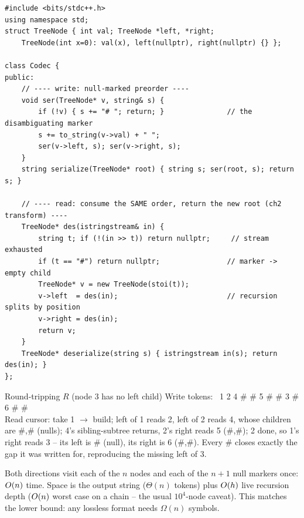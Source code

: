 \begin{lstlisting}[caption={Serialize/Deserialize (LeetCode 297) -- marked-preorder codec}, label={lst:c03-summit-codec}]
#include <bits/stdc++.h>
using namespace std;
struct TreeNode { int val; TreeNode *left, *right;
    TreeNode(int x=0): val(x), left(nullptr), right(nullptr) {} };

class Codec {
public:
    // ---- write: null-marked preorder ----
    void ser(TreeNode* v, string& s) {
        if (!v) { s += "# "; return; }               // the disambiguating marker
        s += to_string(v->val) + " ";
        ser(v->left, s); ser(v->right, s);
    }
    string serialize(TreeNode* root) { string s; ser(root, s); return s; }

    // ---- read: consume the SAME order, return the new root (ch2 transform) ----
    TreeNode* des(istringstream& in) {
        string t; if (!(in >> t)) return nullptr;     // stream exhausted
        if (t == "#") return nullptr;                // marker -> empty child
        TreeNode* v = new TreeNode(stoi(t));
        v->left  = des(in);                          // recursion splits by position
        v->right = des(in);
        return v;
    }
    TreeNode* deserialize(string s) { istringstream in(s); return des(in); }
};
\end{lstlisting}

\begin{tracebox}{Round-tripping $R$ (node $3$ has no left child)}
Write tokens: \ 1 2 4 \# \# 5 \# \# 3 \# 6 \# \# \\
Read cursor: take 1 $\to$ build; left of 1 reads 2, left of 2 reads 4, whose children are
\#,\# (nulls); 4's sibling-subtree returns, 2's right reads 5 (\#,\#); 2 done, so 1's right
reads 3 -- its left is \# (null), its right is 6 (\#,\#). Every \# closes exactly the gap
it was written for, reproducing the missing left of $3$.
\end{tracebox}

\begin{complexitybox}
Both directions visit each of the $n$ nodes and each of the $n+1$ null markers once:
$O(n)$ time. Space is the output string ($\Theta(n)$ tokens) plus $O(h)$ live
recursion depth ($O(n)$ worst case on a chain -- the usual $10^{4}$-node caveat). This
matches the lower bound: any lossless format needs $\Omega(n)$ symbols.
\end{complexitybox}

